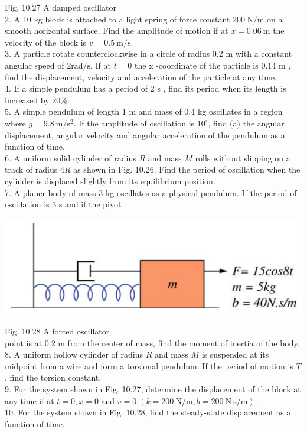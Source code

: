 \documentclass[10pt]{article}
\begin{document}
Fig. 10.27 A damped oscillator\\
2. A 10 kg block is attached to a light spring of force constant $200 \mathrm{~N} / \mathrm{m}$ on a smooth horizontal surface. Find the amplitude of motion if at $x=0.06 \mathrm{~m}$ the velocity of the block is $v=0.5 \mathrm{~m} / \mathrm{s}$.\\
3. A particle rotate counterclockwise in a circle of radius 0.2 m with a constant angular speed of $2 \mathrm{rad} / \mathrm{s}$. If at $t=0$ the x -coordinate of the particle is 0.14 m , find the displacement, velocity and acceleration of the particle at any time.\\
4. If a simple pendulum has a period of 2 s , find its period when its length is increased by $20 \%$.\\
5. A simple pendulum of length 1 m and mass of 0.4 kg oscillates in a region where $g=9.8 \mathrm{~m} / \mathrm{s}^{2}$. If the amplitude of oscillation is $10^{\circ}$, find (a) the angular displacement, angular velocity and angular acceleration of the pendulum as a function of time.\\
6. A uniform solid cylinder of radius $R$ and mass $M$ rolls without slipping on a track of radius $4 R$ as shown in Fig. 10.26. Find the period of oscillation when the cylinder is displaced slightly from its equilibrium position.\\
7. A planer body of mass 3 kg oscillates as a physical pendulum. If the period of oscillation is 3 s and if the pivot

\begin{center}
\includegraphics[max width=\textwidth]{2024_09_13_db1f357d2aad0a03eb2eg-178(1)}
\end{center}

Fig. 10.28 A forced oscillator\\
point is at 0.2 m from the center of mass, find the moment of inertia of the body.\\
8. A uniform hollow cylinder of radius $R$ and mass $M$ is suspended at its midpoint from a wire and form a torsional pendulum. If the period of motion is $T$, find the torsion constant.\\
9. For the system shown in Fig. 10.27, determine the displacement of the block at any time if at $t=0, x=0$ and $v=0 .(k=200 \mathrm{~N} / \mathrm{m}, b=200 \mathrm{~N} \mathrm{~s} / \mathrm{m})$.\\
10. For the system shown in Fig. 10.28, find the steady-state displacement as a function of time.
\end{document}
